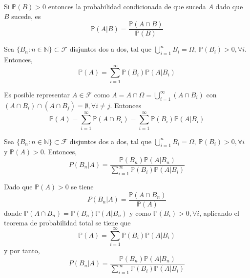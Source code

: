 \begin{defn}
Si $\mathbb{P}(B) > 0$ entonces la probabilidad condicionada de que suceda $A$ dado que $B$ sucede, es \[ \mathbb{P}(A|B) = \frac{\mathbb{P}(A\cap B)}{\mathbb{P}(B)} \]
\end{defn}

\begin{theo}
Sea $\{B_n: n\in\mathbb{N}\}\subset\mathcal{F}$ disjuntos dos a dos, tal que $\bigcup_{i=1}^n B_i = \Omega, \ \mathbb{P}(B_i)>0, \forall i$. Entonces, \[ \mathbb{P}(A) = \sum_{i=1}^\infty \mathbb{P}(B_i)\mathbb{P}(A|B_i) \]
\end{theo}

\begin{ejr}

\end{ejr}

\begin{ejr}

\end{ejr}

\begin{ejr}

\end{ejr}

\begin{dem}
Es posible representar $A\in\mathcal{F}$ como $A = A \cap \Omega = \bigcup_{i=1}^\infty (A\cap B_i)$ con $ (A\cap B_i) \cap (A \cap B_j) = \emptyset, \forall i \neq j$. Entonces \[ \mathbb{P}(A) = \sum_{i=1}^\infty \mathbb{P}(A\cap B_i) = \sum_{i=1}^\infty \mathbb{P}(B_i)\mathbb{P}(A|B_i)\]
\end{dem}

\begin{theo}[de Bayes]
Sea $\{B_n: n\in\mathbb{N}\}\subset\mathcal{F}$ disjuntos dos a dos, tal que $\bigcup_{i=1}^n B_i = \Omega, \ \mathbb{P}(B_i)>0,\forall i$ y $\mathbb{P}(A) > 0$. Entonces, \[ P(B_n|A) = \frac{\mathbb{P}(B_n)\mathbb{P}(A|B_n)}{\sum_{i=1}^\infty \mathbb{P}(B_i)\mathbb{P}(A|B_i)} \]
\end{theo}

\begin{dem}
Dado que $\mathbb{P}(A) > 0$ se tiene \[ P(B_n|A) = \frac{\mathbb{P}(A\cap B_n)}{\mathbb{P}(A)} \] donde $\mathbb{P}(A\cap B_n) = \mathbb{P}(B_n)\mathbb{P}(A|B_n)$ y como $\mathbb{P}(B_i)>0,\forall i$, aplicando el teorema de probabilidad total se tiene que \[ \mathbb{P}(A) = \sum_{i=1}^\infty \mathbb{P}(B_i)\mathbb{P}(A|B_i) \] y por tanto, \[ P(B_n|A) = \frac{\mathbb{P}(B_n)\mathbb{P}(A|B_n)}{\sum_{i=1}^\infty \mathbb{P}(B_i)\mathbb{P}(A|B_i)} \]
\end{dem}

